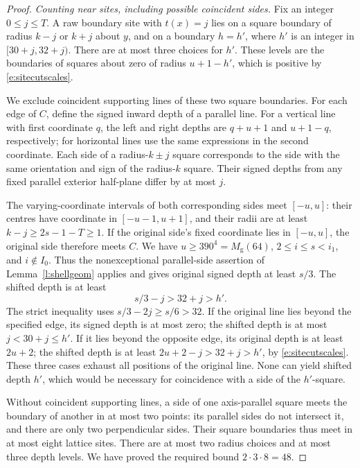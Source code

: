 \begin{proof}
\emph{Counting near sites, including possible coincident sides.}
Fix an integer \(0\le j\le T\).  A raw boundary site with
\(t(x)=j\) lies on a square boundary of radius \(k-j\) or
\(k+j\) about \(y\), and on a boundary \(h=h'\), where
\(h'\) is an integer in \([30+j,32+j)\).
There are at most three choices for \(h'\).  These levels
are the boundaries of squares about zero of radius \(u+1-h'\),
which is positive by \eqref{e:sitecutscales}.

We exclude coincident supporting lines of these two square
boundaries.  For each edge of \(C\), define the signed inward
depth of a parallel line.  For a vertical line with first
coordinate \(q\), the left and right depths are
\(q+u+1\) and \(u+1-q\), respectively; for horizontal lines
use the same expressions in the second coordinate.  Each side
of a radius-\(k\pm j\) square corresponds to the side with
the same orientation and sign of the radius-\(k\) square.
Their signed depths from any fixed parallel exterior half-plane
differ by at most \(j\).

The varying-coordinate intervals of both corresponding sides
meet \([-u,u]\): their centres have coordinate in
\([-u-1,u+1]\), and their radii are at least
\(k-j\ge2s-1-T\ge1\).
If the original side's fixed coordinate lies in \([-u,u]\),
the original side therefore meets \(C\).  We have
\(u\ge390^4=M_{\mathrm g}(64)\), \(2\le i\le s<i_1\), and
\(i\notin I_0\).  Thus the nonexceptional parallel-side assertion
of Lemma~\ref{l:shellgeom} applies and gives original signed depth
at least \(s/3\).  The shifted depth is at least
\[
                   s/3-j>32+j>h'.
\]
The strict inequality uses \(s/3-2j\ge s/6>32\).
If the original line lies beyond the specified edge, its signed
depth is at most zero; the shifted depth is at most
\(j<30+j\le h'\).  If it lies beyond the opposite edge,
its original depth is at least \(2u+2\); the shifted depth is
at least \(2u+2-j>32+j>h'\), by
\eqref{e:sitecutscales}.  These three cases exhaust all positions
of the original line.  None can yield shifted depth \(h'\),
which would be necessary for coincidence with a side of the
\(h'\)-square.

Without coincident supporting lines, a side of one axis-parallel
square meets the boundary of another in at most two points:
its parallel sides do not intersect it, and there are only two
perpendicular sides.  Their square boundaries thus meet in
at most eight lattice sites.  There are at most two radius
choices and at most three depth levels.  We have proved the
required bound \(2\cdot3\cdot8=48\).


\end{proof}
